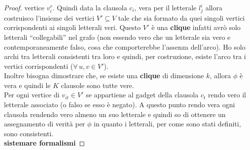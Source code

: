 \begin{proof}
											vertice $v_i^r$. Quindi data la clausola $c_i$, vera per il letterale $l_j^i$
											allora costruisco l'insieme dei vertici $V'\subseteq V$ tale che sia formato
											da quei singoli vertici corrispondenti ai singoli letterali veri. Questo $V'$
											è una \textbf{clique} infatti avrò solo letterali ``collegabili'' nel grafo
											(non essendo vero che un letterale sia vero e contemporaneamente falso, cosa
											che comporterebbe l'assenza dell'arco). Ho solo archi tra letterali
											consistenti tra loro e quindi, per costruzione, esiste l'arco tra i vertici
											corrispondenti ($\forall\, u,v\in V'$).\\
											Inoltre bisogna dimostrare che, se esiste una \textbf{clique} di dimensione
											$k$, allora $\phi$ è vera e quindi le $K$ clausole sono tutte vere. \\
											Per ogni vertice di $v_{it}\in V'$ se appartiene al gadget della clausola
											$c_t$ rendo vero il letterale associato (o falso se esso è negato). A questo
											punto rendo vera ogni clausola rendendo vero almeno un suo letterale e quindi
											so di ottenere un assegnamento di verità per $\phi$ in quanto i letterali, per
											come sono stati definiti, sono consistenti.
											\\ \textbf{sistemare formalismi}
										\end{proof}
